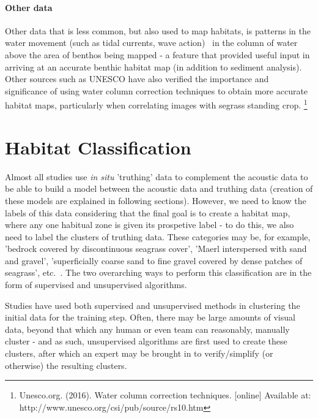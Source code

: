             \paragraph{Other data}
             Other data that is less common, but also used to map habitats, is patterns in the water movement (such as tidal currents, wave action)~\citep*{cjbrown11} in the column of water above the area of benthos being mapped - a feature that provided useful input in arriving at an accurate benthic habitat map (in addition to sediment analysis).~\citep*{snelgrove94} Other sources such as UNESCO have also verified the importance and significance of using water column correction techniques to obtain more accurate habitat maps, particularly when correlating images with segrass standing crop. \footnote{Unesco.org. (2016). Water column correction techniques. [online] Available at: http://www.unesco.org/csi/pub/source/rs10.htm} 

            \section{Habitat Classification}

             Almost all studies use \textit{in situ} 'truthing' data to complement the acoustic data to be able to build a model between the acoustic data and truthing data (creation of these models are explained in following sections). However, we need to know the labels of this data considering that the final goal is to create a habitat map, where any one habitual zone is given its prospetive label - to do this, we also need to label the clusters of truthing data. These categories may be, for example, 'bedrock covered by discontinuous seagrass cover', 'Maerl interspersed with sand and gravel', 'superficially coarse sand to fine gravel covered by dense patches of seagrass', etc.~\citep{micallef12}. The two overarching ways to perform this classification are in the form of supervised and unsupervised algorithms.


            Studies have used both supervised and unsupervised methods in clustering the initial data for the training step. Often, there may be large amounts of visual data, beyond that which any human or even team can reasonably, manually cluster - and as such, unsupervised algorithms are first used to create these clusters, after which an expert may be brought in to verify/simplify (or otherwise) the resulting clusters.~\citep*{steinberg11} 

